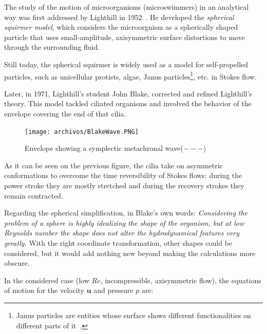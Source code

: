 The study of the motion of microorganisms (microswimmers) in an analytical way was first addressed by Lighthill in 1952~\cite{Lighthill}. He developed the \textit{spherical squirmer model}, which considers the microorgnism as a spherically shaped particle that uses small-amplitude, axisymmetric surface distortions to move through the surrounding fluid.

Still today, the spherical squirmer is widely used as a model for self-propelled particles, such as unicellular protists, algae, Janus particles\footnote{Janus particles are entities whose surface shows different functionalities on different parts of it~\cite{PGG}.}, etc. in Stokes flow.

Later, in 1971, Lighthill’s student John Blake,  corrected and refined Lighthill's theory. This model tackled ciliated organisms and involved the behavior of the envelope covering the end of that cilia. 

\begin{figure}[H]
	\centering
	\texttt{[image: archivos/BlakeWave.PNG]}
	\caption[Caption for LOF]{Envelope showing a symplectic metachronal wave\protect\footnotemark ($---$)~\cite{Pedley}}
	\label{symplectic_wave}
\end{figure}

As it can be seen on the previous figure, the cilia take on asymmetric conformations to overcome the time reversibility of Stokes flows: during the power stroke they are mostly stretched and during the recovery strokes they remain contracted.

Regarding the spherical simplification, in Blake's own words: \textit{Considering the problem of a sphere is highly idealizing the shape of the organism, but at low Reynolds number the shape does not alter the hydrodynamical features very greatly.} With the right coordinate transformation, other shapes could be considered, but it would add nothing new beyond making the calculations more obscure.


In the considered case (low $Re$, incompressible, axisymmetric flow), the equations of motion for the velocity $\mathbf{u}$ and pressure $p$ are: 

